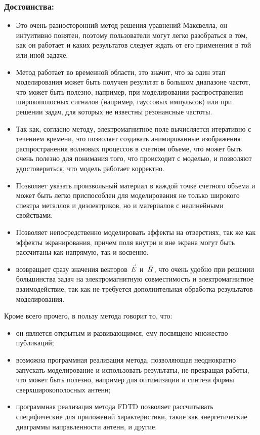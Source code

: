 \subsubsection*{Достоинства:}
\begin{itemize}

\item
Это очень разносторонний метод решения уравнений Максвелла, он
интуитивно понятен, поэтому пользователи могут легко разобраться в том, как он
работает и каких результатов следует ждать от его применения в той или иной задаче.

\item
Метод работает во временной области, это значит, что за один этап моделирования
может быть получен результат в большом диапазоне частот, что может быть полезно,
например, при моделировании распространения широкополосных сигналов (например,
гауссовых импульсов) или при решении задач, для которых не известны резонансные
частоты.

\item
Так как, согласно методу, электромагнитное поле вычисляется итеративно с течением времени,
это позволяет создавать анимированные изображения распространения волновых
процессов в счетном объеме, что может быть очень полезно для
понимания того, что происходит с моделью, и позволяют удостовериться, что модель
работает корректно.

\item
Позволяет указать произвольный материал в каждой точке счетного объема и может быть
легко приспособлен для моделирования не только широкого спектра металлов и
диэлектриков, но и материалов с нелинейными свойствами.

\item
Позволяет непосредственно моделировать эффекты на отверстиях, так же как
эффекты экранирования, причем поля внутри и вне экрана могут быть рассчитаны как
напрямую, так и косвенно.

\item
возвращает сразу значения векторов~$\vec{E\mathstrut}$ и~$\vec{H\mathstrut}$, что
очень удобно при решении большинства задач на электромагнитную совместимость
и электромагнитное взаимодействие, так как не требуется дополнительная обработка
результатов моделирования.
\end{itemize}
Кроме всего прочего, в пользу метода говорит то, что:
\begin{itemize}

\item
он является открытым и развивающимся, ему посвящено множество публикаций;

\item
возможна программная реализация метода, позволяющая неоднократно запускать
моделирование и использовать результаты, не прекращая работы, что может быть
полезно, например для оптимизации и синтеза формы сверхширокополосных антенн;

\item
программная реализация метода FDTD позволяет рассчитывать специфические для
приложений характеристики, такие как энергетические диаграммы направленности
антенн, и другие.
\end{itemize}

